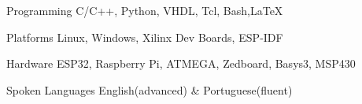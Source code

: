 
    


\begin{cvskills}

  \cvskill
    {Programming} %
    {C/C++, Python, VHDL, Tcl, Bash,\LaTeX} %
    
  \cvskill
    {Platforms} %
    {Linux, Windows, Xilinx Dev Boards, ESP‑IDF} %
    
  \cvskill
    {Hardware} %
    {ESP32, Raspberry Pi, ATMEGA, Zedboard, Basys3, MSP430} %
    
    
    
  \cvskill
    {Spoken Languages} %
    {English(advanced) \& Portuguese(fluent)} %

\end{cvskills}
